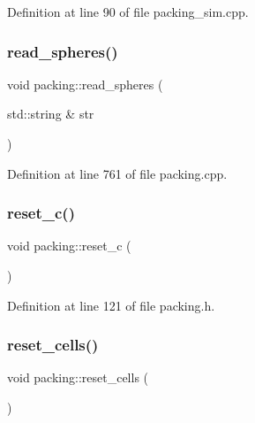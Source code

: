 Definition at line 90 of file packing\+\_\+sim.\+cpp.

\mbox{\label{classpacking_a15619b62e055ec5e1897fb8d40b194b2}} 
\subsubsection{\texorpdfstring{read\+\_\+spheres()}{read\_spheres()}}
{\footnotesize\ttfamily void packing\+::read\+\_\+spheres (\begin{DoxyParamCaption}\item[{std\+::string \&}]{str }\end{DoxyParamCaption})}



Definition at line 761 of file packing.\+cpp.

\mbox{\label{classpacking_aa6f391cfee43bbb59dc71221a23c8d83}} 
\subsubsection{\texorpdfstring{reset\+\_\+c()}{reset\_c()}}
{\footnotesize\ttfamily void packing\+::reset\+\_\+c (\begin{DoxyParamCaption}{ }\end{DoxyParamCaption})\hspace{0.3cm}{\ttfamily [inline]}}



Definition at line 121 of file packing.\+h.

\mbox{\label{classpacking_a7f866169806cadb74aaed38e246d11e5}} 
\subsubsection{\texorpdfstring{reset\+\_\+cells()}{reset\_cells()}}
{\footnotesize\ttfamily void packing\+::reset\+\_\+cells (\begin{DoxyParamCaption}{ }\end{DoxyParamCaption})}



